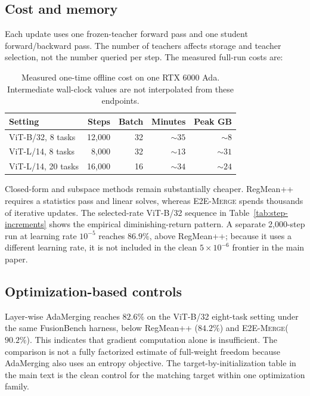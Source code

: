 \documentclass[letterpaper]{article} %
\newcommand{\method}{\textup{\textsc{E2E-Merge}}\xspace}
\theoremstyle{plain}
\theoremstyle{definition}
\begin{document}
\subsection{Cost and memory}
\label{app:cost}
Each update uses one frozen-teacher forward pass and one student forward/backward pass.
The number of teachers affects storage and teacher selection, not the number queried per
step. The measured full-run costs are:

\begin{table}[tb]
\centering
{\small
\begin{tabular*}{\columnwidth}{@{\extracolsep{\fill}}lrrrr}
\toprule
Setting & Steps & Batch & Minutes & Peak GB \\
\midrule
ViT-B/32, 8 tasks & 12,000 & 32 & $\sim35$ & $\sim8$ \\
ViT-L/14, 8 tasks & 8,000 & 32 & $\sim13$ & $\sim31$ \\
ViT-L/14, 20 tasks & 16,000 & 16 & $\sim34$ & $\sim24$ \\
\bottomrule
\end{tabular*}
}
\caption{Measured one-time offline cost on one RTX 6000 Ada. Intermediate
wall-clock values are not interpolated from these endpoints.}
\label{tab:cost-app}
\end{table}

Closed-form and subspace methods remain substantially cheaper. RegMean++ requires a
statistics pass and linear solves, whereas \method spends thousands of iterative
updates. The selected-rate ViT-B/32 sequence in Table~\ref{tab:step-increments} shows
the empirical diminishing-return pattern. A separate 2,000-step run at learning rate
$10^{-5}$ reaches $86.9\%$, above RegMean++; because it uses a different learning rate,
it is not included in the clean $5\times10^{-6}$ frontier in the main paper.

\subsection{Optimization-based controls}
\label{app:optimization-controls}
Layer-wise AdaMerging reaches $82.6\%$ on the ViT-B/32 eight-task setting under the same
FusionBench harness, below RegMean++ ($84.2\%$) and \method ($90.2\%$). This indicates
that gradient computation alone is insufficient. The comparison is not a fully
factorized estimate of full-weight freedom because AdaMerging also uses an entropy
objective. The target-by-initialization table in the main text is the clean control for
the matching target within one optimization family.
\end{document}
